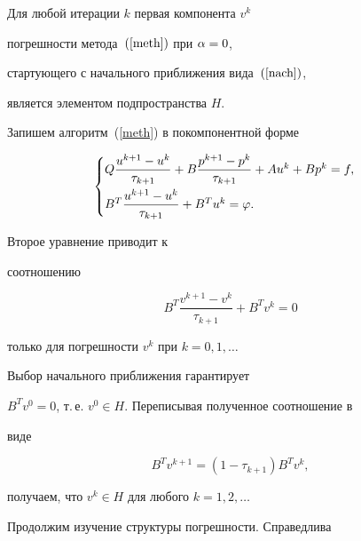 \begin{lem}


Для любой итерации $k$ первая компонента $v^k$


погрешности метода~$(\ref{meth})$ при $\alpha=0$,


стартующего с начального приближения вида~$(\ref{nach})$,


является элементом подпространства $H$.


\end{lem}





\begin{pf}


Запишем алгоритм~(\ref{meth}) в покомпонентной форме


$$


\begin{cases}


Q \dfrac {u^{k+1}-u^k} {\tau_{k+1}} + B \dfrac{p^{k+1}-p^k}{\tau_{k+1}} + 


A u^k + B p^k = f, \\[3mm]


B^T \dfrac{u^{k+1}-u^k}{\tau_{k+1}} + B^Tu^k = \zp.


\end{cases}


$$


Второе уравнение приводит к


соотношению 


$$


B^T \dfrac{v^{k+1}-v^k}{\tau_{k+1}} + B^T v^k = 0 


$$


только для погрешности $v^k$ при $k=0,1,\dotsc$


Выбор начального приближения гарантирует\linebreak


$B^Tv^0=0$, т.\,е. $v^0 \in H$. Переписывая полученное соотношение в


виде


$$


B^Tv^{k+1}=(1-\tau_{k+1})B^Tv^k,


$$


получаем, что $ v^k \in H $ для любого $ k=1,2,\dotsc$


\end{pf}





Продолжим изучение структуры погрешности. Справедлива





